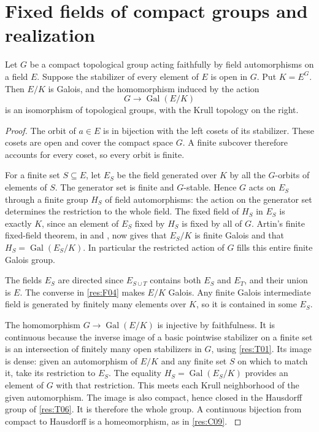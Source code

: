 \section{Fixed fields of compact groups and realization}

\begin{theorem}
\label{res:C11}
Let \(G\) be a compact topological group acting faithfully by field
automorphisms on a field \(E\). Suppose the stabilizer of every
element of \(E\) is open in \(G\). Put \(K=E^G\). Then \(E/K\)
is Galois, and the homomorphism induced by the action
\[
 G \longrightarrow \operatorname{Gal}(E/K)
\]
is an isomorphism of topological groups, with the Krull topology
on the right.
\end{theorem}

\begin{proof}
The orbit of \(a\in E\) is in bijection with the left cosets of its
stabilizer. These cosets are open and cover the compact space \(G\).
A finite subcover therefore accounts for every coset, so every
orbit is finite.

For a finite set \(S\subseteq E\), let \(E_S\) be the field generated
over \(K\) by all the \(G\)-orbits of elements of \(S\). The
generator set is finite and \(G\)-stable. Hence \(G\) acts on
\(E_S\) through a finite group \(H_S\) of field automorphisms:
the action on the generator set determines the restriction to
the whole field. The fixed field of \(H_S\) in \(E_S\) is exactly
\(K\), since an element of \(E_S\) fixed by \(H_S\) is fixed by
all of \(G\). Artin's finite fixed-field theorem, in
\cite[Chapter 14, Artin's fixed-field theorem]{d07} and
\cite[Corollary 3.11]{milne}, now gives that \(E_S/K\) is
finite Galois and that \(H_S=\operatorname{Gal}(E_S/K)\).
In particular the restricted action of \(G\) fills this entire
finite Galois group.

The fields \(E_S\) are directed since \(E_{S\cup T}\) contains
both \(E_S\) and \(E_T\), and their union is \(E\). The converse
in \ref{res:F04} makes \(E/K\) Galois. Any finite Galois
intermediate field is generated by finitely many elements over
\(K\), so it is contained in some \(E_S\).

The homomorphism \(G\to\operatorname{Gal}(E/K)\) is injective
by faithfulness. It is continuous because the inverse image of
a basic pointwise stabilizer on a finite set is an intersection
of finitely many open stabilizers in \(G\), using
\ref{res:T01}. Its image is dense: given an automorphism of
\(E/K\) and any finite set \(S\) on which to match it, take its
restriction to \(E_S\). The equality
\(H_S=\operatorname{Gal}(E_S/K)\) provides an element of \(G\)
with that restriction. This meets each Krull neighborhood of the
given automorphism. The image is also compact, hence closed in
the Hausdorff group of \ref{res:T06}. It is therefore the whole
group. A continuous bijection from compact to Hausdorff is a
homeomorphism, as in \ref{res:C09}.
\cite[Proposition 7.10]{milne}
\end{proof}


